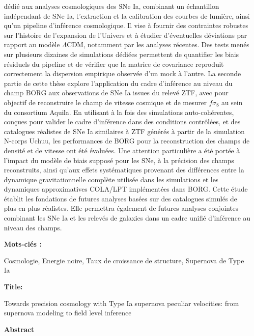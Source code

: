 dédié aux analyses cosmologiques des SNe Ia, combinant un échantillon indépendant de SNe Ia, l’extraction et la calibration des courbes de lumière, ainsi qu’un pipeline 
d’inférence cosmologique. Il vise à fournir des contraintes robustes sur l’histoire de l’expansion de l’Univers et à étudier d’éventuelles déviations par rapport au 
modèle $\Lambda$CDM, notamment par les analyses récentes. Des tests menés sur plusieurs dizaines de simulations dédiées permettent de quantifier les biais résiduels du pipeline et 
de vérifier que la matrice de covariance reproduit correctement la dispersion empirique observée d’un mock à l’autre. La seconde partie de cette thèse explore l’application 
du cadre d’inférence au niveau du champ BORG aux observations de SNe Ia issues du relevé ZTF, avec pour objectif de reconstruire le champ de vitesse cosmique et de mesurer 
$f\sigma_8$ au sein du consortium Aquila. En utilisant à la fois des simulations auto-cohérentes, conçues pour valider le cadre d’inférence dans des conditions contrôlées, et des 
catalogues réalistes de SNe Ia similaires à ZTF générés à partir de la simulation N-corps Uchuu, les performances de BORG pour la reconstruction des champs de densité et 
de vitesse ont été évaluées. Une attention particulière a été portée à l’impact du modèle de biais supposé pour les SNe, à la précision des champs reconstruits, ainsi 
qu’aux effets systématiques provenant des différences entre la dynamique gravitationnelle complète utilisée dans les simulations et les dynamiques approximatives COLA/LPT 
implémentées dans BORG. Cette étude établit les fondations de futures analyses basées sur des catalogues simulés de plus en plus réalistes. Elle permettra également de 
futures analyses conjointes combinant les SNe Ia et les relevés de galaxies dans un cadre unifié d’inférence au niveau des champs.

{\bfseries Mots-clés :}

Cosmologie, Energie noire, Taux de croissance de structure, Supernova de Type Ia

\vspace*{3mm}
\hrulefill
\vspace*{3mm}

\newpage


{\bfseries Title:}

Towards precision cosmology with Type Ia supernova peculiar velocities: from supernova 
modeling to field level inference

{\bfseries Abstract} 


